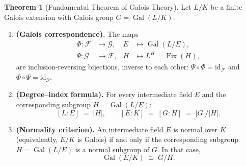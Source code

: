 \documentclass[12pt,a4paper,openany]{book}
\theoremstyle{definition}
\newtheorem{theorem}{Theorem}[chapter]
\theoremstyle{remark}
\DeclareMathOperator{\Gal}{Gal}
\DeclareMathOperator{\Fix}{Fix}
\begin{document}
\begin{theorem}[Fundamental Theorem of Galois Theory]\label{thm:ftgt}
Let $L/K$ be a finite Galois extension with Galois group $G=\Gal(L/K)$.
\begin{enumerate}
\item\label{it:ftgt-bij}
\textbf{(Galois correspondence).}\;
The maps
\begin{align*}
  \Phi\colon \mathcal{F}&\longrightarrow \mathcal{G},
    &E&\longmapsto \Gal(L/E),\\
  \Psi\colon \mathcal{G}&\longrightarrow \mathcal{F},
    &H&\longmapsto L^{H}=\Fix(H),
\end{align*}
are inclusion-reversing bijections, inverse to each other:
$\Psi\circ\Phi=\mathrm{id}_{\mathcal{F}}$ and
$\Phi\circ\Psi=\mathrm{id}_{\mathcal{G}}$.

\item\label{it:ftgt-deg}
\textbf{(Degree--index formula).}\;
For every intermediate field $E$ and the corresponding subgroup
$H=\Gal(L/E)$:
\[
  [L:E] \;=\; |H|, \qquad
  [E:K] \;=\; [G:H] \;=\; |G|/|H|.
\]

\item\label{it:ftgt-normal}
\textbf{(Normality criterion).}\;
An intermediate field $E$ is normal over $K$ (equivalently, $E/K$ is
Galois) if and only if the corresponding subgroup $H=\Gal(L/E)$ is a
normal subgroup of $G$.  In that case,
\[
  \Gal(E/K) \;\cong\; G/H.
\]
\end{enumerate}
\end{theorem}
\end{document}
